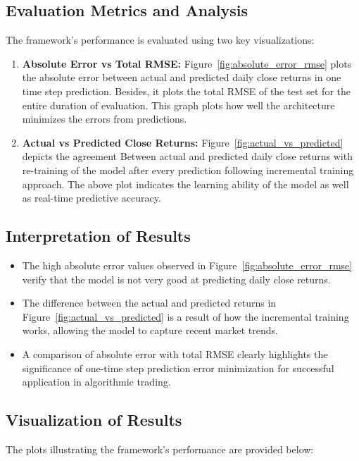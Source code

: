 \subsection{Evaluation Metrics and Analysis}
The framework's performance is evaluated using two key visualizations:
\begin{enumerate}
    \item \textbf{Absolute Error vs Total RMSE:} Figure~\ref{fig:absolute_error_rmse} plots the absolute error between actual and predicted daily close returns in one time step prediction. Besides, it plots the total RMSE of the test set for the entire duration of evaluation. This graph plots how well the architecture minimizes the errors from predictions.

    \item \textbf{Actual vs Predicted Close Returns:} Figure~\ref{fig:actual_vs_predicted} depicts the agreement
Between actual and predicted daily close returns with re-training of the model after every prediction following incremental training approach. The above plot indicates the learning ability of the model as well as real-time predictive accuracy.
\end{enumerate}

\subsection{Interpretation of Results}
\begin{itemize}
    \item The high absolute error values observed in Figure~\ref{fig:absolute_error_rmse} verify that the model is not very good at predicting daily close returns.
    \item The difference between the actual and predicted returns in  Figure~\ref{fig:actual_vs_predicted} is a result of how the incremental training works, allowing the model to capture recent market trends.
    \item A comparison of absolute error with total RMSE clearly highlights the significance of one-time step prediction error minimization for successful application in algorithmic trading.
\end{itemize}

\subsection{Visualization of Results}
The plots illustrating the framework's performance are provided below:

